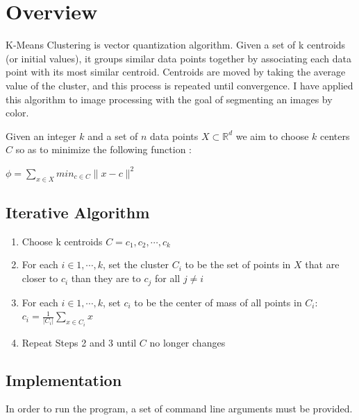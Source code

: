\documentclass[11pt]{article}
\begin{document}
\maketitle

\section{Overview}

K-Means Clustering is vector quantization algorithm. Given a set of k centroids
(or initial values), it groups similar data points together by associating each
data point with its most similar centroid. Centroids are moved by taking the
average value of the cluster, and this process is repeated until convergence. I
have applied this algorithm to image processing with the goal of segmenting
an images by color.

Given an integer $k$ and a set of $n$ data points $X \subset \mathbb{R}^d$ we aim
to choose $k$ centers $C$ so as to minimize the following function \cite{arthur}:
\newline

\begin{math}
\phi = \displaystyle\sum_{x \in X} min_{c \in C }\| x - c \|^2
\end{math}

\subsection{Iterative Algorithm}

\begin{enumerate}
\item Choose k centroids $C = {c_1, c_2, \cdots, c_k}$
\item For each $i \in {1, \cdots, k}$, set the cluster $C_i$ to be the set of points in $X$ that are closer to $c_i$ than they are to $c_j$ for all $j \neq i$
\item For each $i \in {1, \cdots, k}$, set $c_i$ to be the center of mass of all points in $C_i$: $c_i = \frac{1}{|C_i|}\sum_{x \in C_i}x$
\item Repeat Steps 2 and 3 until $C$ no longer changes
\end{enumerate}

\subsection{Implementation}

In order to run the program, a set of command line arguments must be provided.
\end{document}
